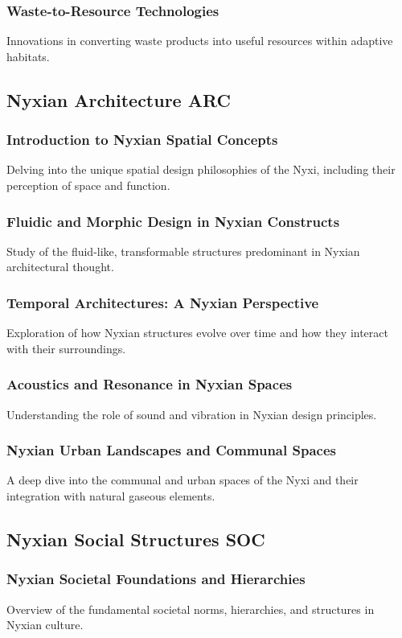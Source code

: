 \subsubsection{Waste-to-Resource Technologies}
Innovations in converting waste products into useful resources within adaptive habitats.

\subsection{Nyxian Architecture \hfill ARC}
\subsubsection{Introduction to Nyxian Spatial Concepts}
Delving into the unique spatial design philosophies of the Nyxi, including their perception of space and function.
\subsubsection{Fluidic and Morphic Design in Nyxian Constructs}
Study of the fluid-like, transformable structures predominant in Nyxian architectural thought.
\subsubsection{Temporal Architectures: A Nyxian Perspective}
Exploration of how Nyxian structures evolve over time and how they interact with their surroundings.
\subsubsection{Acoustics and Resonance in Nyxian Spaces}
Understanding the role of sound and vibration in Nyxian design principles.
\subsubsection{Nyxian Urban Landscapes and Communal Spaces}
A deep dive into the communal and urban spaces of the Nyxi and their integration with natural gaseous elements.


\subsection{Nyxian Social Structures \hfill SOC}
\subsubsection{Nyxian Societal Foundations and Hierarchies}
Overview of the fundamental societal norms, hierarchies, and structures in Nyxian culture.
